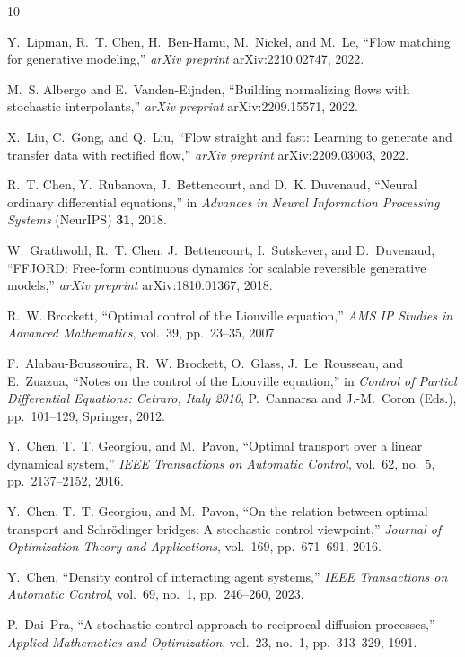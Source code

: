 \documentclass[12pt]{amsart}
\renewcommand{\(}{\left (}
\renewcommand{\)}{\right )}
\numberwithin{equation}{section}
\begin{document}
\begin{thebibliography}{10}

Y.~Lipman, R.~T. Chen, H.~Ben-Hamu, M.~Nickel, and M.~Le,
``Flow matching for generative modeling,''
\emph{arXiv preprint} arXiv:2210.02747, 2022.

M.~S. Albergo and E.~Vanden-Eijnden,
``Building normalizing flows with stochastic interpolants,''
\emph{arXiv preprint} arXiv:2209.15571, 2022.

X.~Liu, C.~Gong, and Q.~Liu,
``Flow straight and fast: Learning to generate and transfer data with rectified flow,''
\emph{arXiv preprint} arXiv:2209.03003, 2022.

R.~T. Chen, Y.~Rubanova, J.~Bettencourt, and D.~K. Duvenaud,
``Neural ordinary differential equations,''
in \emph{Advances in Neural Information Processing Systems} (NeurIPS) \textbf{31}, 2018.

W.~Grathwohl, R.~T. Chen, J.~Bettencourt, I.~Sutskever, and D.~Duvenaud,
``FFJORD: Free-form continuous dynamics for scalable reversible generative models,''
\emph{arXiv preprint} arXiv:1810.01367, 2018.

R.~W. Brockett,
``Optimal control of the Liouville equation,''
\emph{AMS IP Studies in Advanced Mathematics}, vol.~39, pp.~23--35, 2007.

F.~Alabau-Boussouira, R.~W. Brockett, O.~Glass, J.~Le~Rousseau, and E.~Zuazua,
``Notes on the control of the Liouville equation,''
in \emph{Control of Partial Differential Equations: Cetraro, Italy 2010},
P.~Cannarsa and J.-M.~Coron (Eds.), pp.~101--129, Springer, 2012.

Y.~Chen, T.~T. Georgiou, and M.~Pavon,
``Optimal transport over a linear dynamical system,''
\emph{IEEE Transactions on Automatic Control}, vol.~62, no.~5, pp.~2137--2152, 2016.

Y.~Chen, T.~T. Georgiou, and M.~Pavon,
``On the relation between optimal transport and Schr\"{o}dinger bridges: A stochastic control viewpoint,''
\emph{Journal of Optimization Theory and Applications}, vol.~169, pp.~671--691, 2016.

Y.~Chen,
``Density control of interacting agent systems,''
\emph{IEEE Transactions on Automatic Control}, vol.~69, no.~1, pp.~246--260, 2023.

P.~Dai~Pra,
``A stochastic control approach to reciprocal diffusion processes,''
\emph{Applied Mathematics and Optimization}, vol.~23, no.~1, pp.~313--329, 1991.


\end{thebibliography}
\end{document}
